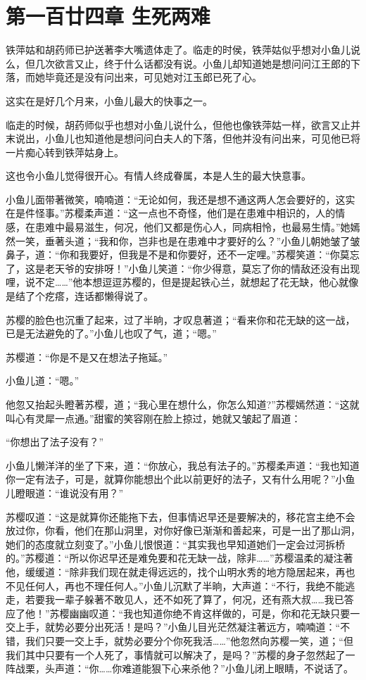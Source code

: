 \documentclass[12pt,oneside]{book}
\begin{document}
\hypertarget{ux7b2cux4e00ux767eux5effux56dbux7ae0-ux751fux6b7bux4e24ux96be}{%
\chapter{第一百廿四章
生死两难}\label{ux7b2cux4e00ux767eux5effux56dbux7ae0-ux751fux6b7bux4e24ux96be}}

铁萍姑和胡药师已护送著李大嘴遗体走了。临走的时侯，铁萍姑似乎想对小鱼儿说么，但几次欲言又止，终于什么话都没有说。小鱼儿却知道她是想问问江王郎的下落，而她毕竟还是没有问出来，可见她对江玉郎已死了心。

这实在是好几个月来，小鱼儿最大的快事之一。

临走的时候，胡药师似乎也想对小鱼儿说什么，但他也像铁萍姑一样，欲言又止并末说出，小鱼儿也知道他是想问问白夫人的下落，但他并没有问出来，可见他已将一片痴心转到铁萍姑身上。

这也令小鱼儿觉得很开心。有情人终成眷属，本是人生的最大快意事。

小鱼儿面带著微笑，喃喃道：``无论如何，我还是想不通这两人怎会要好的，这实在是件怪事。''苏樱柔声道：``这一点也不奇怪，他们是在患难中相识的，人的情感，在患难中最易滋生，何况，他们又都是伤心人，同病相怜，也最易生情。''她嫣然一笑，垂著头道；``我和你，岂非也是在患难中才要好的么？''小鱼儿朝她皱了皱鼻子，道：``你和我要好，但我是不是和你要好，还不一定哩。''苏樱笑道：``你莫忘了，这是老天爷的安排呀！''小鱼儿笑道：``你少得意，莫忘了你的情敌还没有出现哩，说不定\ldots\ldots{}''他本想逗逗苏樱的，但是提起铁心兰，就想起了花无缺，他心就像是结了个疙瘩，连话都懒得说了。

苏樱的脸色也沉重了起来，过了半晌，才叹息著道；``看来你和花无缺的这一战，已是无法避免的了。''小鱼儿也叹了气，道；``嗯。''

苏樱道：``你是不是又在想法子拖延。''

小鱼儿道：``嗯。''

他忽又抬起头瞪著苏樱，道；``我心里在想什么，你怎么知道?''苏樱嫣然道：``这就叫心有灵犀一点通。''甜蜜的笑容刚在脸上掠过，她就又皱起了眉道：

``你想出了法子没有？''

小鱼儿懒洋洋的坐了下来，道：``你放心，我总有法子的。''苏樱柔声道：``我也知道你一定有法子，可是，就算你能想出个此以前更好的法子，又有什么用呢？''小鱼儿瞪眼道：``谁说没有用？''

苏樱叹道：``这是就算你还能拖下去，但事情迟早还是要解决的，移花宫主绝不会放过你，你看，他们在那山洞里，对你好像已渐渐和善起来，可是一出了那山洞，她们的态度就立刻变了。''小鱼儿恨恨道：``其实我也早知道她们一定会过河拆桥的。''苏樱道：``所以你迟早还是难免要和花无缺一战，除非\ldots\ldots{}''苏樱温柔的凝注著他，缓缓道：``除非我们现在就走得远远的，找个山明水秀的地方隐居起来，再也不见任何人，再也不理任何人。''小鱼儿沉默了半晌，大声道：``不行，我绝不能逃走，若要我一辈子躲著不敢见人，还不如死了算了，何况，还有燕大叔\ldots\ldots 我已答应了他！''苏樱幽幽叹道：``我也知道你绝不肯这样做的，可是，你和花无缺只要一交上手，就势必要分出死活！是吗？''小鱼儿目光茫然凝注著远方，喃喃道：``不错，我们只要一交上手，就势必要分个你死我活\ldots\ldots{}''他忽然向苏樱一笑，道；``但我们其中只要有一个人死了，事情就可以解决了，是吗？''苏樱的身子忽然起了一阵战栗，头声道：``你\ldots\ldots 你难道能狠下心来杀他？''小鱼儿闭上眼睛，不说话了。
\end{document}
